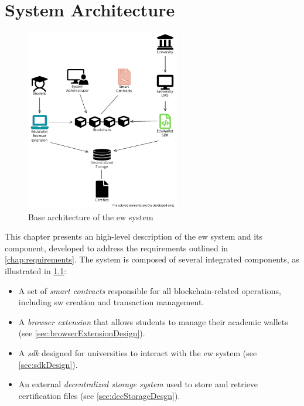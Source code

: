 \chapter{System Architecture}

\begin{figure}
  \centering
  \includegraphics[width=0.6\textwidth]{figures/Architecture diagram basic.pdf}
  \caption[System basic architecture diagram]{Base architecture of the \acrlong{ew} system}
  \label{fig:baseArchDiag}
\end{figure}

This chapter presents an high-level description of the \acrlong{ew} system and its component, developed to address the requirements outlined in \cref{chap:requirements}. The system is composed of several integrated components, as illustrated in \cref{fig:baseArchDiag}:
\begin{itemize}
    \item A set of \textit{smart contracts} responsible for all blockchain-related operations, including \acrshort{sw} creation and transaction management.
    \item A \textit{browser extension} that allows students to manage their academic wallets (see \cref{sec:browserExtensionDesign}).
    \item A \textit{\acrfull{sdk}} designed for universities to interact with the \acrshort{ew} system (see \cref{sec:sdkDesign}).
    \item An external \textit{decentralized storage system} used to store and retrieve certification files (see \cref{sec:decStorageDesgn}).
\end{itemize}

